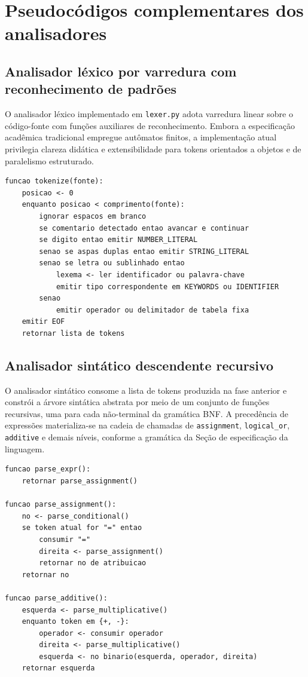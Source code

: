 
\section{Pseudocódigos complementares dos analisadores}
\label{app:pseudocode}

\subsection{Analisador léxico por varredura com reconhecimento de padrões}

O analisador léxico implementado em \texttt{lexer.py} adota varredura linear sobre o código-fonte com funções auxiliares de reconhecimento. Embora a especificação acadêmica tradicional empregue autômatos finitos, a implementação atual privilegia clareza didática e extensibilidade para tokens orientados a objetos e de paralelismo estruturado.

\begin{lstlisting}[caption={Pseudocodigo do analisador lexico}]
funcao tokenize(fonte):
    posicao <- 0
    enquanto posicao < comprimento(fonte):
        ignorar espacos em branco
        se comentario detectado entao avancar e continuar
        se digito entao emitir NUMBER_LITERAL
        senao se aspas duplas entao emitir STRING_LITERAL
        senao se letra ou sublinhado entao
            lexema <- ler identificador ou palavra-chave
            emitir tipo correspondente em KEYWORDS ou IDENTIFIER
        senao
            emitir operador ou delimitador de tabela fixa
    emitir EOF
    retornar lista de tokens
\end{lstlisting}

\subsection{Analisador sintático descendente recursivo}

O analisador sintático consome a lista de tokens produzida na fase anterior e constrói a árvore sintática abstrata por meio de um conjunto de funções recursivas, uma para cada não-terminal da gramática BNF. A precedência de expressões materializa-se na cadeia de chamadas de \texttt{assignment}, \texttt{logical\_or}, \texttt{additive} e demais níveis, conforme a gramática da Seção de especificação da linguagem.

\begin{lstlisting}[caption={Pseudocodigo simplificado de expressoes com precedencia}]
funcao parse_expr():
    retornar parse_assignment()

funcao parse_assignment():
    no <- parse_conditional()
    se token atual for "=" entao
        consumir "="
        direita <- parse_assignment()
        retornar no de atribuicao
    retornar no

funcao parse_additive():
    esquerda <- parse_multiplicative()
    enquanto token em {+, -}:
        operador <- consumir operador
        direita <- parse_multiplicative()
        esquerda <- no binario(esquerda, operador, direita)
    retornar esquerda
\end{lstlisting}

